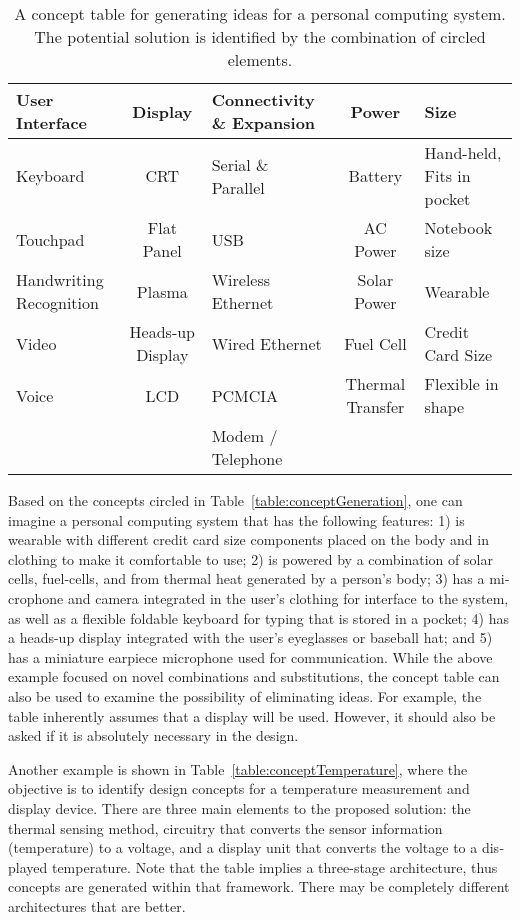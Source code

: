 \begin{table}
\caption{A concept table for generating ideas for a personal
computing system. The potential so­lution is identified by the
combination of circled elements.}
\label{table:conceptPersonalComputing}
\begin{tabular}{|p{2cm}|c|p{2cm}|c|p{2cm}|}
\hline
\rowcolor{Gray}
\textbf{User Interface}&
\textbf{Display} &
\textbf{Connectivity \& Expansion} &
\textbf{Power} &
\textbf{Size}\\ \hline
Keyboard & CRT & Serial \& Parallel & Battery & Hand-held, Fits in pocket \\ \hline
Touchpad & Flat Panel & USB & AC Power & Notebook size \\ \hline
Handwriting Recognition & Plasma & Wireless Ethernet & Solar Power & Wearable \\ \hline
Video & Heads-up Display & Wired Ethernet & Fuel Cell & Credit Card Size \\ \hline
Voice & LCD & PCMCIA & Thermal Transfer & Flexible in shape \\ \hline
& & Modem / Telephone & & \\ \hline
\end{tabular}
\end{table}

Based on the concepts circled in 
Table~\ref{table:conceptGeneration}, one can imagine a personal
computing system that has the following features: 1) is wearable with
different credit card size components placed on the body and in clothing
to make it comfortable to use; 2) is powered by a combina­tion of solar
cells, fuel-cells, and from thermal heat generated by a person's body;
3) has a mi­crophone and camera integrated in the user's clothing for
interface to the system, as well as a flexible foldable keyboard for
typing that is stored in a pocket; 4) has a heads-up display inte­grated
with the user's eyeglasses or baseball hat; and 5) has a miniature
earpiece microphone used for communication. While the above example
focused on novel combinations and substitu­tions, the concept table can
also be used to examine the possibility of eliminating ideas. For
example, the table inherently assumes that a display will be used.
However, it should also be asked if it is abso­lutely necessary in the
design.

Another example is shown in Table~\ref{table:conceptTemperature}, 
where the objective is to
identify design concepts for a temperature measurement and display
device. There are three main elements to the pro­posed solution: the
thermal sensing method, circuitry that converts the sensor in­formation
(temperature) to a voltage, and a display unit that converts the voltage
to a dis­played temperature. Note that the table implies a three-stage
architecture, thus concepts are generated within that framework. There
may be completely different architec­tures that are better.


